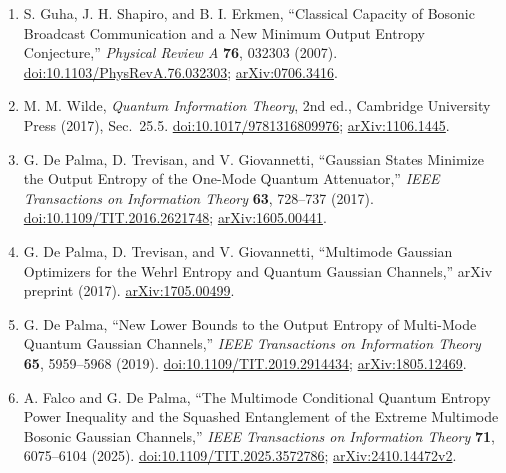 \begin{enumerate}[label={},leftmargin=4.8em,labelsep=0.5em]
  \footnotesize
  \item[\textup{[GSE07]}]\label{ref:p75-guha-shapiro-erkmen}
  S. Guha, J. H. Shapiro, and B. I. Erkmen, ``Classical Capacity of Bosonic
  Broadcast Communication and a New Minimum Output Entropy Conjecture,''
  \emph{Physical Review A} \textbf{76}, 032303 (2007).
  \href{https://doi.org/10.1103/PhysRevA.76.032303}{doi:10.1103/PhysRevA.76.032303};
  \href{https://arxiv.org/abs/0706.3416}{arXiv:0706.3416}.

  \item[\textup{[Wil17]}]\label{ref:p75-wilde}
  M. M. Wilde, \emph{Quantum Information Theory}, 2nd ed., Cambridge
  University Press (2017), Sec.~25.5.
  \href{https://doi.org/10.1017/9781316809976}{doi:10.1017/9781316809976};
  \href{https://arxiv.org/abs/1106.1445}{arXiv:1106.1445}.

  \item[\textup{[DTG17]}]\label{ref:p75-de-palma-one-mode}
  G. De Palma, D. Trevisan, and V. Giovannetti, ``Gaussian States Minimize
  the Output Entropy of the One-Mode Quantum Attenuator,'' \emph{IEEE
  Transactions on Information Theory} \textbf{63}, 728--737 (2017).
  \href{https://doi.org/10.1109/TIT.2016.2621748}{doi:10.1109/TIT.2016.2621748};
  \href{https://arxiv.org/abs/1605.00441}{arXiv:1605.00441}.

  \item[\textup{[DTG17b]}]\label{ref:p75-de-palma-multimode}
  G. De Palma, D. Trevisan, and V. Giovannetti, ``Multimode Gaussian
  Optimizers for the Wehrl Entropy and Quantum Gaussian Channels,'' arXiv
  preprint (2017).
  \href{https://arxiv.org/abs/1705.00499}{arXiv:1705.00499}.

  \item[\textup{[DP19]}]\label{ref:p75-de-palma-eb}
  G. De Palma, ``New Lower Bounds to the Output Entropy of Multi-Mode Quantum
  Gaussian Channels,'' \emph{IEEE Transactions on Information Theory}
  \textbf{65}, 5959--5968 (2019).
  \href{https://doi.org/10.1109/TIT.2019.2914434}{doi:10.1109/TIT.2019.2914434};
  \href{https://arxiv.org/abs/1805.12469}{arXiv:1805.12469}.

  \item[\textup{[FDP25]}]\label{ref:p75-falco-de-palma}
  A. Falco and G. De Palma, ``The Multimode Conditional Quantum Entropy Power
  Inequality and the Squashed Entanglement of the Extreme Multimode Bosonic
  Gaussian Channels,'' \emph{IEEE Transactions on Information Theory}
  \textbf{71}, 6075--6104 (2025).
  \href{https://doi.org/10.1109/TIT.2025.3572786}{doi:10.1109/TIT.2025.3572786};
  \href{https://arxiv.org/abs/2410.14472v2}{arXiv:2410.14472v2}.
\end{enumerate}

